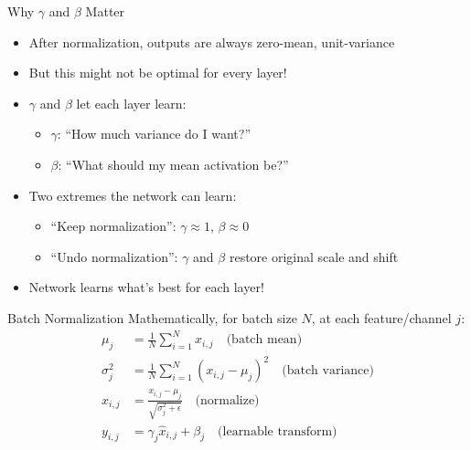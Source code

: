 \begin{frame}{Why $\gamma$ and $\beta$ Matter}
    \begin{itemize}
        \item After normalization, outputs are always zero-mean, unit-variance
        \item But this might not be optimal for every layer!
        \item $\gamma$ and $\beta$ let each layer learn:
        \begin{itemize}
            \item $\gamma$: ``How much variance do I want?''
            \item $\beta$: ``What should my mean activation be?''
        \end{itemize}
        \item Two extremes the network can learn:
        \begin{itemize}
            \item ``Keep normalization'': $\gamma \approx 1$, $\beta \approx 0$
            \item ``Undo normalization'': $\gamma$ and $\beta$ restore original scale and shift
        \end{itemize}
        \item Network learns what's best for each layer!
    \end{itemize}
\end{frame}

\begin{frame}{Batch Normalization}
    Mathematically, for batch size $N$, at each feature/channel $j$:
    \[
    \begin{aligned}
    \mu_j &= \frac{1}{N}\sum_{i=1}^N x_{i,j} \quad \text{(batch mean)} \\
    \sigma^2_j &= \frac{1}{N}\sum_{i=1}^N (x_{i,j} - \mu_j)^2 \quad \text{(batch variance)} \\
    \hat{x}_{i,j} &= \frac{x_{i,j} - \mu_j}{\sqrt{\sigma^2_j + \epsilon}} \quad \text{(normalize)} \\
    y_{i,j} &= \gamma_j\hat{x}_{i,j} + \beta_j \quad \text{(learnable transform)}
    \end{aligned}
    \]
\end{frame}

